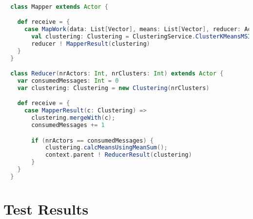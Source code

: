\begin{lstlisting}[float,label=lst:actor_implementation,
  caption={Actor Implementation},
  language=Scala,  
  showspaces=false,
  showtabs=false,
  breaklines=true,
  showstringspaces=false,
  breakatwhitespace=true,
  commentstyle=\color{greencomments},
  keywordstyle=\color{bluekeywords},
  stringstyle=\color{redstrings}]  % Start your code-block

  class Mapper extends Actor {

    def receive = {
      case MapWork(data: List[Vector], means: List[Vector], reducer: ActorRef) =>
        val clustering: Clustering = ClusteringService.ClusterKMeansMSIncremental(data, means)
        reducer ! MapperResult(clustering)
    }
  }

  class Reducer(nrActors: Int, nrClusters: Int) extends Actor {
    var consumedMessages: Int = 0
    var clustering: Clustering = new Clustering(nrClusters)

    def receive = {
      case MapperResult(c: Clustering) =>
        clustering.mergeWith(c);
        consumedMessages += 1

        if (nrActors == consumedMessages) {
            clustering.calcMeansUsingMeanSum();
            context.parent ! ReducerResult(clustering)
        }
    }
  }  
\end{lstlisting}


\section{Test Results}


